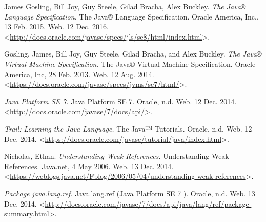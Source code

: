 \begin{thebibliography}{21}

James Gosling, Bill Joy, Guy Steele, Gilad Bracha, Alex Buckley. \textit{The Java® Language Specification.} The Java® Language Specification. Oracle America, Inc., 13 Feb. 2015. Web. 12 Dec. 2016. <\url{http://docs.oracle.com/javase/specs/jls/se8/html/index.html}>.










Gosling, James, Bill Joy, Guy Steele, Gilad Bracha, and Alex Buckley. \textit{The Java® Virtual Machine Specification.} The Java® Virtual Machine Specification. Oracle America, Inc, 28 Feb. 2013. Web. 12 Aug. 2014. <\url{https://docs.oracle.com/javase/specs/jvms/se7/html/}>.



\textit{Java Platform SE 7.} Java Platform SE 7. Oracle, n.d. Web. 12 Dec. 2014. <\url{http://docs.oracle.com/javase/7/docs/api/}>.


\textit{Trail: Learning the Java Language.} The Java™ Tutorials. Oracle, n.d. Web. 12 Dec. 2014. <\url{https://docs.oracle.com/javase/tutorial/java/index.html}>.


Nicholas, Ethan. \textit{Understanding Weak References.} Understanding Weak References. Java.net, 4 May 2006. Web. 13 Dec. 2014. <\url{https://weblogs.java.net/Fblog/2006/05/04/understanding-weak-references}>.


\textit{Package java.lang.ref.} Java.lang.ref (Java Platform SE 7 ). Oracle, n.d. Web. 13 Dec. 2014. <\url{http://docs.oracle.com/javase/7/docs/api/java/lang/ref/package-summary.html}>.



\end{thebibliography}
